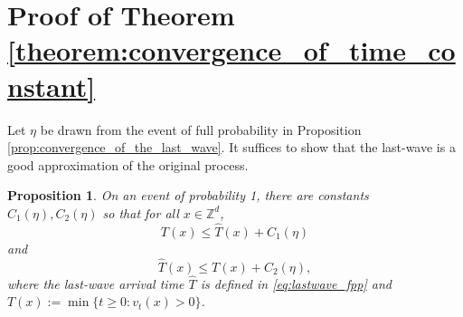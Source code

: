 \documentclass[aap]{imsart}
\newcommand{\Z}{\mathbb{Z}}
\newtheorem{prop}{Proposition}[section]
\begin{document}
\section{Proof of Theorem \ref{theorem:convergence_of_time_constant}} \label{sec:proof_of_theorem}
Let $\eta$ be drawn from the event of full probability in Proposition \ref{prop:convergence_of_the_last_wave}.
It suffices to show that the last-wave is a good approximation of the original process. 


\begin{prop} \label{prop:approximate_subadditive}
	On an event of probability 1, there are constants $C_1(\eta), C_2(\eta)$
	so that for all $x \in \Z^d$, 
	\begin{equation} \label{eq:ineq1}
	T(x) \leq \hat{T}(x) + C_1(\eta)
	\end{equation}
	and
	\begin{equation} \label{eq:ineq2}
	\hat{T}(x) \leq T(x) + C_2(\eta),
	\end{equation}
	where the last-wave arrival time $\hat{T}$ is defined in \eqref{eq:lastwave_fpp}  
	and $T(x) := \min \{ t \geq 0 : v_t(x) > 0 \}$. 
\end{prop}
\end{document}
